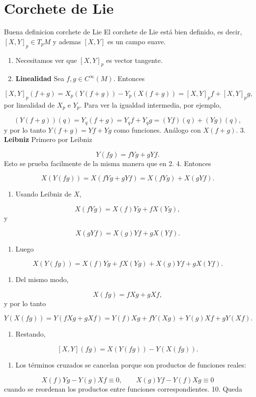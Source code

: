 \section{Corchete de Lie}
\begin{bookproposition}{Buena definicion corchete de Lie}
El corchete de Lie está bien definido, es decir, $[X,Y]_p\in T_pM$ y ademas $[X,Y]$ es un campo suave.

\end{bookproposition}
\begin{bookproof}{}
\begin{enumerate}
\item Necesitamos ver que $[X,Y]_p$ es vector tangente.
\item \textbf{Linealidad} Sea $f,g\in C^\infty(M)$. Entonces
\end{enumerate}
\[
[X,Y]_p(f+g)=X_p(Y(f+g))-Y_p(X(f+g))=[X,Y]_pf+[X,Y]_pg,
\]
por linealidad de $X_p$ e $Y_p$. Para ver la igualdad intermedia, por ejemplo,

\[
(Y(f+g))(q)=Y_q(f+g)=Y_qf+Y_qg=(Yf)(q)+(Yg)(q),
\]
y por lo tanto $Y(f+g)=Yf+Yg$ como funciones. Análogo con $X(f+g)$. 3. \textbf{Leibniz} Primero por Leibniz

\[
Y(fg)=fYg+gYf.
\]
Esto se prueba facilmente de la misma manera que en 2. 4. Entonces

\[
X(Y(fg))=X(fYg+gYf)=X(fYg)+X(gYf).
\]
\begin{enumerate}[start=5]
\item Usando Leibniz de $X$,
\end{enumerate}
\[
X(fYg)=X(f)Yg+fX(Yg),
\]
y

\[
X(gYf)=X(g)Yf+gX(Yf).
\]
\begin{enumerate}[start=6]
\item Luego
\end{enumerate}
\[
X(Y(fg))=X(f)Yg+fX(Yg)+X(g)Yf+gX(Yf).
\]
\begin{enumerate}[start=7]
\item Del mismo modo,
\end{enumerate}
\[
X(fg)=fXg+gXf,
\]
y por lo tanto

\[
Y(X(fg))=Y(fXg+gXf)=Y(f)Xg+fY(Xg)+Y(g)Xf+gY(Xf).
\]
\begin{enumerate}[start=8]
\item Restando,
\end{enumerate}
\[
[X,Y](fg)=X(Y(fg))-Y(X(fg)).
\]
\begin{enumerate}[start=9]
\item Los términos cruzados se cancelan porque son productos de funciones reales:
\end{enumerate}
\[
X(f)Yg-Y(g)Xf\equiv0,\qquad X(g)Yf-Y(f)Xg\equiv0
\]
cuando se reordenan los productos entre funciones correspondientes. 10. Queda


\end{bookproof}
